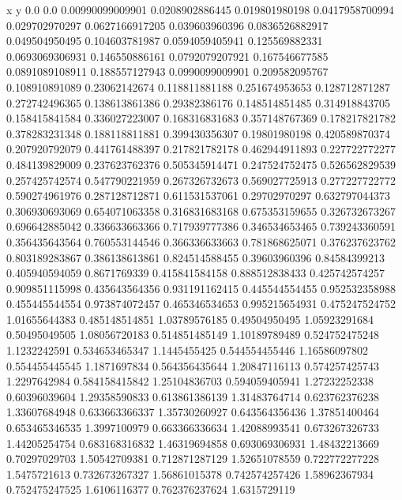               x                y
            0.0              0.0
0.00990099009901  0.0208902886445
 0.019801980198  0.0417958700994
 0.029702970297  0.0627166917205
 0.039603960396  0.0836526882917
 0.049504950495   0.104603781987
0.0594059405941   0.125569882331
0.0693069306931   0.146550886161
0.0792079207921   0.167546677585
0.0891089108911   0.188557127943
0.0990099009901   0.209582095767
 0.108910891089    0.23062142674
 0.118811881188   0.251674953653
 0.128712871287   0.272742496365
 0.138613861386    0.29382386176
 0.148514851485   0.314918843705
 0.158415841584   0.336027223007
 0.168316831683   0.357148767369
 0.178217821782   0.378283231348
 0.188118811881   0.399430356307
  0.19801980198   0.420589870374
 0.207920792079   0.441761488397
 0.217821782178   0.462944911893
 0.227722772277   0.484139829009
 0.237623762376   0.505345914471
 0.247524752475   0.526562829539
 0.257425742574   0.547790221959
 0.267326732673   0.569027725913
 0.277227722772   0.590274961976
 0.287128712871   0.611531537061
  0.29702970297   0.632797044373
 0.306930693069   0.654071063358
 0.316831683168   0.675353159655
 0.326732673267   0.696642885042
 0.336633663366   0.717939777386
 0.346534653465   0.739243360591
 0.356435643564   0.760553144546
 0.366336633663   0.781868625071
 0.376237623762   0.803189283867
 0.386138613861   0.824514588455
  0.39603960396    0.84584399213
 0.405940594059     0.8671769339
 0.415841584158   0.888512838433
 0.425742574257   0.909851115998
 0.435643564356   0.931191162415
 0.445544554455   0.952532358988
 0.455445544554   0.973874072457
 0.465346534653   0.995215654931
 0.475247524752    1.01655644383
 0.485148514851    1.03789576185
  0.49504950495    1.05923291684
  0.50495049505    1.08056720183
 0.514851485149    1.10189789489
 0.524752475248     1.1232242591
 0.534653465347     1.1445455425
 0.544554455446    1.16586097802
 0.554455445545     1.1871697834
 0.564356435644    1.20847116113
 0.574257425743     1.2297642984
 0.584158415842    1.25104836703
 0.594059405941    1.27232252338
  0.60396039604    1.29358590833
 0.613861386139    1.31483764714
 0.623762376238    1.33607684948
 0.633663366337    1.35730260927
 0.643564356436    1.37851400464
 0.653465346535     1.3997100979
 0.663366336634    1.42088993541
 0.673267326733    1.44205254754
 0.683168316832    1.46319694858
 0.693069306931    1.48432213669
  0.70297029703    1.50542709381
 0.712871287129    1.52651078559
 0.722772277228     1.5475721613
 0.732673267327    1.56861015378
 0.742574257426    1.58962367934
 0.752475247525     1.6106116377
 0.762376237624     1.6315729119
